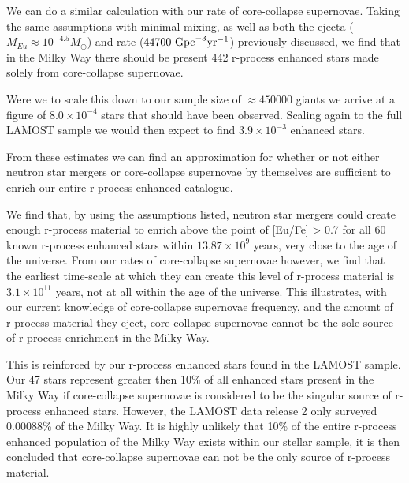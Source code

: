 \documentclass[a4paper,fleqn,usenatbib]{mnras}
\begin{document}
    We can do a similar calculation with our rate of core-collapse supernovae. Taking the same assumptions with minimal mixing, as well as both the ejecta ($M_{Eu}\approx10^{-4.5} M_{\odot}$) and rate ($44700\ \rm{Gpc}^{-3} \rm{yr^{-1}}$) previously discussed, we find that in the Milky Way there should be present 442 r-process enhanced stars made solely from core-collapse supernovae.
    
    Were we to scale this down to our sample size of $\approx450000$ giants we arrive at a figure of $8.0\times10^{-4}$ stars that should have been observed. Scaling again to the full LAMOST sample we would then expect to find $3.9\times10^{-3}$ enhanced stars. 
    
    From these estimates we can find an approximation for whether or not either neutron star mergers or core-collapse supernovae by themselves are sufficient to enrich our entire r-process enhanced catalogue. 
    
    We find that, by using the assumptions listed, neutron star mergers could create enough r-process material to enrich above the point of [Eu/Fe] > 0.7 for all 60 known r-process enhanced stars within $13.87\times10^9$ years, very close to the age of the universe. From our rates of core-collapse supernovae however, we find that the earliest time-scale at which they can create this level of r-process material is $3.1\times10^{11}$ years, not at all within the age of the universe. This illustrates, with our current knowledge of core-collapse supernovae frequency, and the amount of r-process material they eject, core-collapse supernovae cannot be the sole source of r-process enrichment in the Milky Way.
    
    This is reinforced by our r-process enhanced stars found in the LAMOST sample. Our 47 stars represent greater then 10\% of all enhanced stars present in the Milky Way if core-collapse supernovae is considered to be the singular source of r-process enhanced stars. However, the LAMOST data release 2 only surveyed 0.00088\% of the Milky Way. It is highly unlikely that 10\% of the entire r-process enhanced population of the Milky Way exists within our stellar sample, it is then concluded that core-collapse supernovae can not be the only source of r-process material. 
    
\end{document}
